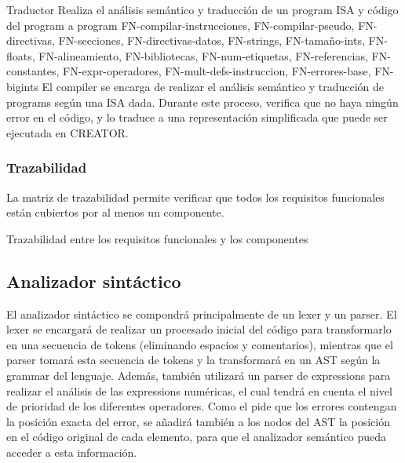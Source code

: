 \begin{component}{Traductor}
    {Realiza el análisis semántico y traducción de un \gls{program} } %
    {\NA} %
    {\gls{ISA} y código del \gls{program} a } %
    {\Gls{program} } %
    {FN-compilar-instrucciones, FN-compilar-pseudo, FN-directivas,
    FN-secciones, FN-directivas-datos, FN-strings, FN-tamaño-ints,
    FN-floats, FN-alineamiento, FN-bibliotecas, FN-num-etiquetas,
    FN-referencias, FN-constantes, FN-expr-operadores,
    FN-mult-defs-instruccion, FN-errores-base, FN-bigints} %
    El \gls{compiler} se encarga de realizar el análisis semántico y traducción
    de \glspl{program}  según una \gls{ISA} dada.
    Durante este proceso, verifica que no haya ningún error en el código, y lo
    traduce a una representación simplificada que puede ser ejecutada en
    CREATOR.
\end{component}

\let\componentref\undefined

\FloatBarrier

\subsubsection{Trazabilidad}

La matriz de trazabilidad permite verificar que todos los requisitos funcionales
están cubiertos por al menos un componente.

\begin{landscape}
        {Trazabilidad entre los requisitos funcionales y los componentes}
\end{landscape}

\FloatBarrier

\subsection{Analizador sintáctico}

El analizador sintáctico se compondrá principalmente de un \gls{lexer} y un
\gls{parser}. El \gls{lexer} se encargará de realizar un procesado inicial del
código para transformarlo en una secuencia de \glspl{token} (eliminando espacios
y comentarios), mientras que el \gls{parser} tomará esta secuencia de
\glspl{token} y la transformará en un \gls{AST} según la \gls{grammar} del
lenguaje. Además, también utilizará un \gls{parser} de \glspl{expression} para
realizar el análisis de las \glspl{expression} numéricas, el cual tendrá en
cuenta el nivel de prioridad de los diferentes operadores. Como el
 pide que los errores contengan la posición exacta del
error, se añadirá también a los nodos del \gls{AST} la posición en el código
original de cada elemento, para que el analizador semántico pueda acceder a esta
información.


